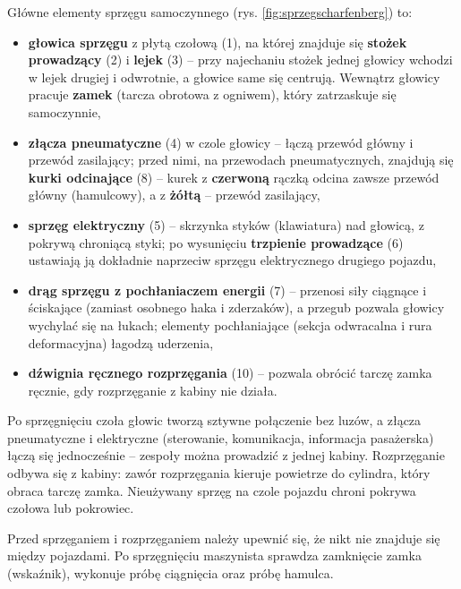Główne elementy sprzęgu samoczynnego (rys. \ref{fig:sprzegscharfenberg}) to:
\begin{itemize}
	\item \textbf{głowica sprzęgu} z płytą czołową (1), na której znajduje się \textbf{stożek prowadzący} (2) i \textbf{lejek} (3) – przy najechaniu stożek jednej głowicy wchodzi w lejek drugiej i odwrotnie, a głowice same się centrują. Wewnątrz głowicy pracuje \textbf{zamek} (tarcza obrotowa z ogniwem), który zatrzaskuje się samoczynnie,
	\item \textbf{złącza pneumatyczne} (4) w czole głowicy – łączą przewód główny i przewód zasilający; przed nimi, na przewodach pneumatycznych, znajdują się \textbf{kurki odcinające} (8) – kurek z \textbf{czerwoną} rączką odcina zawsze przewód główny (hamulcowy), a z \textbf{żółtą} – przewód zasilający,
	\item \textbf{sprzęg elektryczny} (5) – skrzynka styków (klawiatura) nad głowicą, z pokrywą chroniącą styki; po wysunięciu \textbf{trzpienie prowadzące} (6) ustawiają ją dokładnie naprzeciw sprzęgu elektrycznego drugiego pojazdu,
	\item \textbf{drąg sprzęgu z pochłaniaczem energii} (7) – przenosi siły ciągnące i ściskające (zamiast osobnego haka i zderzaków), a przegub pozwala głowicy wychylać się na łukach; elementy pochłaniające (sekcja odwracalna i rura deformacyjna) łagodzą uderzenia,
	\item \textbf{dźwignia ręcznego rozprzęgania} (10) – pozwala obrócić tarczę zamka ręcznie, gdy rozprzęganie z kabiny nie działa.
\end{itemize}

Po sprzęgnięciu czoła głowic tworzą sztywne połączenie bez luzów, a złącza pneumatyczne i elektryczne (sterowanie, komunikacja, informacja pasażerska) łączą się jednocześnie – zespoły można prowadzić z jednej kabiny. Rozprzęganie odbywa się z kabiny: zawór rozprzęgania kieruje powietrze do cylindra, który obraca tarczę zamka. Nieużywany sprzęg na czole pojazdu chroni pokrywa czołowa lub pokrowiec.

\begin{tcolorbox}[colback=yellow!10!white,colframe=orange!80!black,title=Dla drużyny]
	Przed sprzęganiem i rozprzęganiem należy upewnić się, że nikt nie znajduje się między pojazdami. Po sprzęgnięciu maszynista sprawdza zamknięcie zamka (wskaźnik), wykonuje próbę ciągnięcia oraz próbę hamulca.
\end{tcolorbox}



